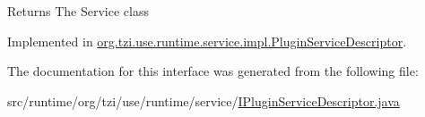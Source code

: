 \begin{DoxyReturn}{Returns}
The Service class 
\end{DoxyReturn}


Implemented in \hyperlink{classorg_1_1tzi_1_1use_1_1runtime_1_1service_1_1impl_1_1_plugin_service_descriptor_a5082b7ae2d72b949349f83b9ccd68bc6}{org.\-tzi.\-use.\-runtime.\-service.\-impl.\-Plugin\-Service\-Descriptor}.



The documentation for this interface was generated from the following file\-:\begin{DoxyCompactItemize}
\item 
src/runtime/org/tzi/use/runtime/service/\hyperlink{_i_plugin_service_descriptor_8java}{I\-Plugin\-Service\-Descriptor.\-java}\end{DoxyCompactItemize}
